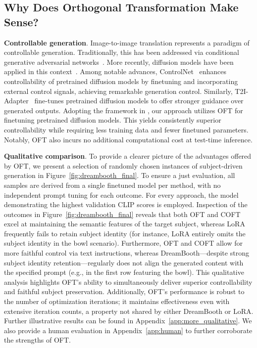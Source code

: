 \subsection{Why Does Orthogonal Transformation Make Sense?}

\textbf{Controllable generation}. Image-to-image translation represents a paradigm of controllable generation. Traditionally, this has been addressed via conditional generative adversarial networks~\cite{isola2017image,zhu2017toward,wang2018high,park2019semantic,choi2018stargan}. More recently, diffusion models have been applied in this context~\cite{saharia2022palette,voynov2022sketch,wang2022pretraining}. Among notable advances, ControlNet~\cite{zhang2023adding} enhances controllability of pretrained diffusion models by finetuning and incorporating external control signals, achieving remarkable generation control. Similarly, T2I-Adapter~\cite{mou2023t2i} fine-tunes pretrained diffusion models to offer stronger guidance over generated outputs. Adopting the framework in \cite{zhang2023adding,mou2023t2i}, our approach utilizes OFT for finetuning pretrained diffusion models. This yields consistently superior controllability while requiring less training data and fewer finetuned parameters. Notably, OFT also incurs no additional computational cost at test-time inference.

\textbf{Qualitative comparison}. To provide a clearer picture of the advantages offered by OFT, we present a selection of randomly chosen instances of subject-driven generation in Figure~\ref{fig:dreambooth_final}. To ensure a just evaluation, all samples are derived from a single finetuned model per method, with no independent prompt tuning for each outcome. For every approach, the model demonstrating the highest validation CLIP scores is employed. Inspection of the outcomes in Figure~\ref{fig:dreambooth_final} reveals that both OFT and COFT excel at maintaining the semantic features of the target subject, whereas LoRA frequently fails to retain subject identity (for instance, LoRA entirely omits the subject identity in the bowl scenario). Furthermore, OFT and COFT allow for more faithful control via text instructions, whereas DreamBooth—despite strong subject identity retention—regularly does not align the generated content with the specified prompt (e.g., in the first row featuring the bowl). This qualitative analysis highlights OFT's ability to simultaneously deliver superior controllability and faithful subject preservation. Additionally, OFT's performance is robust to the number of optimization iterations; it maintains effectiveness even with extensive iteration counts, a property not shared by either DreamBooth or LoRA. Further illustrative results can be found in Appendix~\ref{app:more_qualitative}. We also provide a human evaluation in Appendix~\ref{app:human} to further corroborate the strengths of OFT.

